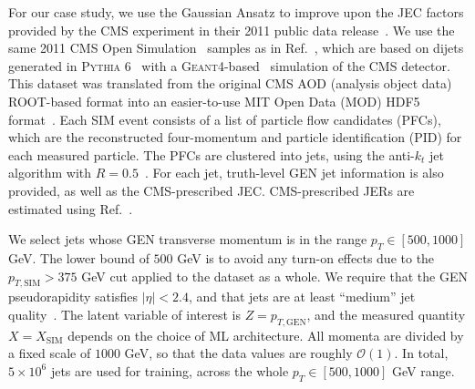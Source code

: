 \documentclass[prl,twocolumn,superscriptaddress,longbibliography,preprintnumbers,floatfix,nofootinbib]{revtex4-1}
\DeclareRobustCommand{\Ref}[1]{Ref.~\cite{#1}}
\newcommand{\GaussianAnsatz}{{Gaussian Ansatz}\xspace}
\begin{document}
For our case study, we use the \GaussianAnsatz to improve upon the JEC factors provided by the CMS experiment in their 2011 public data release~\cite{cmspressrelease}.
%
We use the same 2011 CMS Open Simulation~\cite{cernopendata} samples as in \Ref{Komiske_2020}, which are based on dijets generated in \textsc{Pythia 6}~\cite{Sj_strand_2006} with a \textsc{Geant4}-based~\cite{AGOSTINELLI2003250} simulation of the CMS detector.
%
This dataset was translated from the original CMS AOD (analysis object data) ROOT-based format into an easier-to-use MIT Open Data (MOD) HDF5 format~\cite{komiske_patrick_2019_3340205}.
%
Each SIM event consists of a list of particle flow candidates (PFCs), which are the reconstructed four-momentum and particle identification (PID) for each measured particle.
%
The PFCs are clustered into jets, using the anti-$k_t$ jet algorithm with $R = 0.5$~\cite{Cacciari:2005hq,Cacciari_2008,Cacciari:2011ma}.
%
For each jet, truth-level GEN jet information is also provided, as well as the CMS-prescribed JEC.
%
CMS-prescribed JERs are estimated using \Ref{Khachatryan_2017}.


We select jets whose GEN transverse momentum is in the range $p_T \in [500,1000]$ GeV.
%
The lower bound of $500$ GeV is to avoid any turn-on effects due to the $p_{T, \text{SIM}} > 375$ GeV cut applied to the dataset as a whole.
%
We require that the GEN pseudorapidity satisfies $|\eta| < 2.4$, and that jets are at least ``medium'' jet quality~\cite{CMS:2010xta}.
%
The latent variable of interest is $Z = p_{T,\text{GEN}}$, and the measured quantity $X = X_{\text{SIM}}$ depends on the choice of ML architecture.
%
All momenta are divided by a fixed scale of $1000$ GeV, so that the data values are roughly $\mathcal{O}(1)$.
%
In total, $5\times10^{6}$ jets are used for training, across the whole $p_T \in [500,1000]$ GeV range. 
\end{document}
